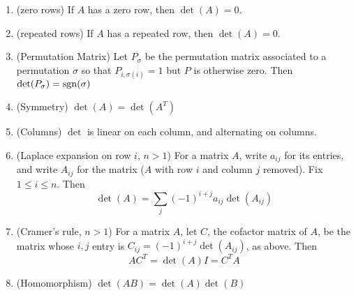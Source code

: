 \begin{theorem}
\begin{enumerate}
		\item (zero rows) \label{zeroRow} If $A$ has a zero row, then $\det(A)=0$.
		\item (repeated rows) \label{repeated} If $A$ has a repeated row, then $\det(A)=0$.
		\item (Permutation Matrix) \label{permutation} Let $P_\sigma$ be the permutation matrix associated to a permutation $\sigma$
		so that $P_{i,\sigma(i)} =1$ but $P$ is otherwise zero.  Then $\det(P_\sigma) = \operatorname{sgn}(\sigma)$
		\item (Symmetry) \label{symmetry} $\det(A) = \det(A^T)$
		\item (Columns) \label{columns} $\det$ is linear on each column, and alternating on columns.
		\item (Laplace expansion on row $i$, $n>1$) \label{laplace} For a matrix $A$, write $a_{ij}$ for its entries, 
		and write $A_{ij}$ for the matrix %
		($A$ with row $i$ and column $j$ removed).  Fix $1 \leq i \leq n$.  Then 
			$$\det(A) = \sum_j (-1)^{i+j} a_{ij} \det(A_{ij})$$	
		\item (Cramer's rule, $n>1$) \label{CramersRule}  For a matrix $A$, let $C$, the cofactor matrix of $A$, be the matrix whose 
		$i,j$ entry is $C_{ij} = (-1)^{i+j} \det(A_{ij})$, as above.  Then 
		$$A C^T = \det(A) I = C^TA$$
		\item (Homomorphism) \label{homomorphism} $\det(AB) = \det(A)\det(B)$
	\end{enumerate}

\end{theorem}
